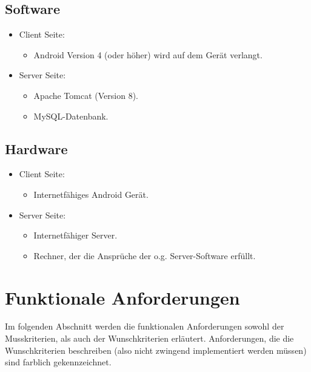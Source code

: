 \documentclass[parskip=full]{scrartcl}
\begin{document}
\subsection{Software}
\begin{itemize}
	\item Client Seite:
	\begin{itemize}
		\item Android Version 4 (oder höher) wird auf dem Gerät verlangt.
	\end{itemize}
	
	\item Server Seite:
	\begin{itemize} 
        \item Apache Tomcat (Version 8).
		\item MySQL-Datenbank. %
    \end{itemize}
\end{itemize}


\subsection{Hardware}
\begin{itemize}
	\item Client Seite:
	\begin{itemize} 
		\item Internetfähiges Android Gerät.
	\end{itemize}
	
	\item Server Seite:
	\begin{itemize}
		\item Internetfähiger Server.
		\item Rechner, der die Ansprüche der o.g. Server-Software erfüllt.
	\end{itemize}		
\end{itemize}

\newpage

\section{Funktionale Anforderungen}
Im folgenden Abschnitt werden die funktionalen Anforderungen sowohl der Musskriterien, als auch der Wunschkriterien erläutert. Anforderungen, die die Wunschkriterien beschreiben (also nicht zwingend implementiert werden müssen) sind \colorbox{shadecolor}{farblich gekennzeichnet}.
\end{document}
